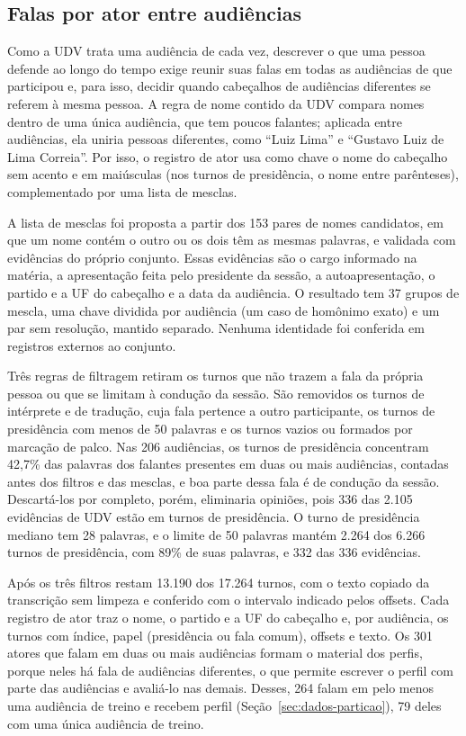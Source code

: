 \subsection{Falas por ator entre audiências}
\label{sec:metodo-atores}

Como a UDV trata uma audiência de cada vez, descrever o que uma pessoa defende ao longo do tempo
exige reunir suas falas em todas as audiências de que participou e, para isso, decidir quando
cabeçalhos de audiências diferentes se referem à mesma pessoa. A regra de nome contido da UDV compara
nomes dentro de uma única audiência, que tem poucos falantes; aplicada entre audiências, ela uniria
pessoas diferentes, como ``Luiz Lima'' e ``Gustavo Luiz de Lima Correia''. Por isso, o registro de ator usa como chave o
nome do cabeçalho sem acento e em maiúsculas (nos turnos de presidência, o nome entre parênteses),
complementado por uma lista de mesclas.

A lista de mesclas foi proposta a partir dos 153 pares de nomes candidatos, em que um nome contém o
outro ou os dois têm as mesmas palavras, e validada com evidências do próprio conjunto. Essas
evidências são o cargo informado na matéria, a apresentação feita pelo presidente da sessão, a
autoapresentação, o partido e a UF do cabeçalho e a data da audiência. O resultado tem 37 grupos de mescla, uma chave
dividida por audiência (um caso de homônimo exato) e um par sem resolução, mantido separado. Nenhuma
identidade foi conferida em registros externos ao conjunto.

Três regras de filtragem retiram os turnos que não trazem a fala da própria pessoa ou que se limitam
à condução da sessão. São removidos os turnos de intérprete e de tradução, cuja fala pertence a outro
participante, os turnos de presidência com menos de 50 palavras e os turnos vazios ou formados por
marcação de palco. Nas 206 audiências, os turnos de presidência concentram 42,7\% das palavras dos
falantes presentes em duas ou mais audiências, contadas antes dos filtros e das mesclas, e boa parte
dessa fala é de condução da sessão. Descartá-los por completo,
porém, eliminaria opiniões, pois 336 das 2.105 evidências de UDV estão em turnos de presidência. O
turno de presidência mediano tem 28 palavras, e o limite de 50 palavras mantém 2.264 dos 6.266 turnos
de presidência, com 89\% de suas palavras, e 332 das 336 evidências.

Após os três filtros restam 13.190 dos 17.264 turnos, com o texto copiado da transcrição sem limpeza
e conferido com o intervalo indicado pelos offsets. Cada registro de ator traz o nome, o partido e
a UF do cabeçalho e, por audiência, os turnos com índice, papel (presidência ou fala comum), offsets e
texto. Os 301 atores que falam em duas ou mais audiências formam o material dos perfis, porque neles
há fala de audiências diferentes, o que permite escrever o perfil com parte das audiências e avaliá-lo nas
demais. Desses, 264 falam em pelo menos uma audiência de treino e recebem perfil
(Seção~\ref{sec:dados-particao}), 79 deles com uma única audiência de treino.

